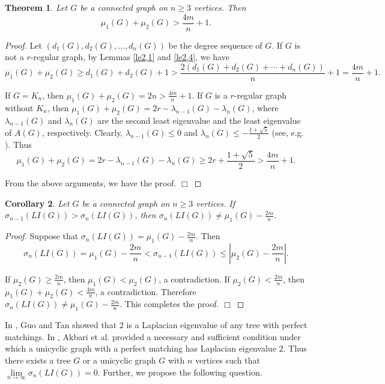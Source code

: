 \documentclass[12pt, a4paper]{article}
\newtheorem{theorem}{Theorem}[section]
\newtheorem{corollary}[theorem]{Corollary}
\begin{document}
\begin{theorem}\label{th3,2} %
Let $G$ be a connected graph on $n\geq 3$ vertices. Then
$$\mu_1(G)+\mu_2(G)> \frac{4m}{n}+1.$$
\end{theorem}

\begin{proof} Let $(d_1(G), d_2(G), \ldots, d_n(G))$ be the degree sequence of $G$. If $G$ is not a $r$-regular graph, by Lemmas \ref{le2,1} and \ref{le2,4}, we have
$$\mu_1(G)+\mu_2(G)\geq d_1(G)+ d_2(G)+1>\frac{2(d_1(G)+ d_2(G)+\cdots+d_n(G))}{n}+1=\frac{4m}{n}+1.$$

If $G=K_n$, then $\mu_1(G)+\mu_2(G)=2n>\frac{4m}{n}+1$. If $G$ is a $r$-regular graph without $K_{n}$, then
$\mu_1(G)+\mu_2(G)=2r-\lambda_{n-1}(G)-\lambda_{n}(G)$,
where $\lambda_{n-1}(G)$ and $\lambda_{n}(G)$ are the second least eigenvalue and the least eigenvalue of $A(G)$, respectively. Clearly, $\lambda_{n-1}(G)\leq 0$ and $\lambda_{n}(G)\leq -\frac{1+\sqrt{5}}{2}$ (see, e.g. \cite{H}). Thus
$$\mu_1(G)+\mu_2(G)=2r-\lambda_{n-1}(G)-\lambda_{n}(G)\geq 2r+\frac{1+\sqrt{5}}{2}>\frac{4m}{n}+1.$$

From the above arguments, we have the proof. $\Box$
\end{proof}


\begin{corollary}\label{cor3,2} %
Let $G$ be a connected graph on $n\geq 3$ vertices. If $\sigma_{n-1}(LI(G))>\sigma_n(LI(G))$, then $\sigma_n(LI(G))\neq \mu_1(G)-\frac{2m}{n}$.
\end{corollary}

\begin{proof} Suppose that $\sigma_n(LI(G))=\mu_1(G)-\frac{2m}{n}$. Then
$$\sigma_n(LI(G))=\mu_1(G)-\frac{2m}{n}< \sigma_{n-1}(LI(G))\leq \left\lvert \mu_2(G)-\frac{2m}{n}\right\lvert.$$

If $\mu_2(G)\geq \frac{2m}{n}$, then $\mu_1(G)<\mu_2(G)$, a contradiction.
If $\mu_2(G)<\frac{2m}{n}$, then $\mu_1(G)+\mu_2(G)< \frac{4m}{n}$, a contradiction.
Therefore $\sigma_n(LI(G))\neq \mu_1(G)-\frac{2m}{n}$. This completes the proof. $\Box$
\end{proof}




In \cite{GT}, Guo and Tan showed that $2$ is a Laplacian eigenvalue of any tree with perfect matchings. In \cite{AKM}, Akbari et al. provided a necessary and sufficient condition
under which a unicyclic graph with a perfect matching has Laplacian eigenvalue $2$. Thus there exists a tree $G$ or a unicyclic graph $G$ with $n$ vertices such that $\lim\limits_{n\rightarrow \infty}\sigma_{n}(LI(G))=0$.
Further, we propose the following question.
\end{document}
